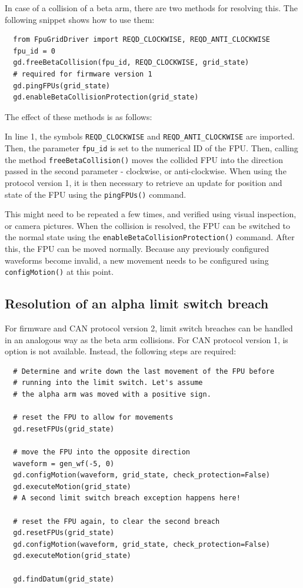 \documentclass{scrartcl}[12pt,a4paper]
\begin{document}
In case of a collision of a beta arm, there are two
methods for resolving this. The following snippet
shows how to use them:

\begin{verbatim}
  from FpuGridDriver import REQD_CLOCKWISE, REQD_ANTI_CLOCKWISE
  fpu_id = 0
  gd.freeBetaCollision(fpu_id, REQD_CLOCKWISE, grid_state)
  # required for firmware version 1
  gd.pingFPUs(grid_state)
  gd.enableBetaCollisionProtection(grid_state)
\end{verbatim}

The effect of these methods is as follows:

In line 1, the symbols \texttt{REQD\_CLOCKWISE} and
\texttt{REQD\_ANTI\_CLOCKWISE} are imported.
Then, the parameter \texttt{fpu\_id} is set to the
numerical ID of the FPU. Then, calling the method
\texttt{freeBetaCollision()} moves the collided FPU
into the direction passed in the second parameter
- clockwise, or anti-clockwise. When using the protocol
version 1, it is then necessary to retrieve an update
for position and state of the FPU using the \texttt{pingFPUs()}
command.

This might need to be repeated a few times, and verified using visual
inspection, or camera pictures. When the collision is resolved, the
FPU can be switched to the normal state using the
\texttt{enableBetaCollisionProtection()} command.  After this, the FPU
can be moved normally. Because any previously configured waveforms
become invalid, a new movement needs to be configured using
\texttt{configMotion()} at this point.

\subsection{Resolution of an alpha limit switch breach}

For firmware and CAN protocol  version 2, limit switch
breaches can be handled in an analogous way as the
beta arm collisions. For CAN protocol version 1,
is option is not available. Instead, the following
steps are required:

\begin{verbatim}
  # Determine and write down the last movement of the FPU before
  # running into the limit switch. Let's assume
  # the alpha arm was moved with a positive sign.

  # reset the FPU to allow for movements
  gd.resetFPUs(grid_state)

  # move the FPU into the opposite direction
  waveform = gen_wf(-5, 0)
  gd.configMotion(waveform, grid_state, check_protection=False)
  gd.executeMotion(grid_state)
  # A second limit switch breach exception happens here!

  # reset the FPU again, to clear the second breach
  gd.resetFPUs(grid_state)
  gd.configMotion(waveform, grid_state, check_protection=False)
  gd.executeMotion(grid_state)

  gd.findDatum(grid_state)
  
\end{verbatim}
  
\end{document}
